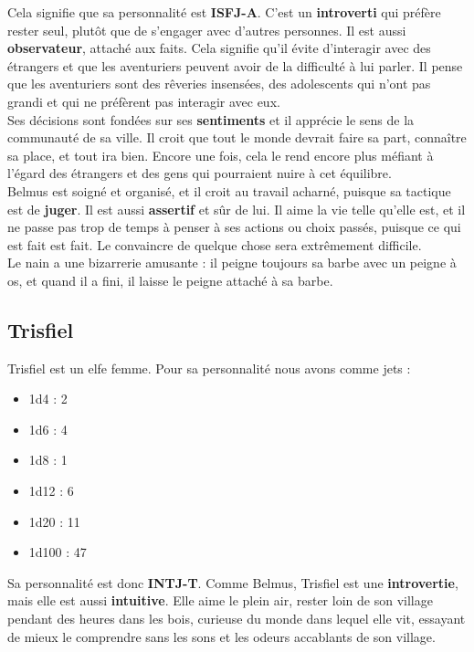 \documentclass{article}
\begin{document}
Cela signifie que sa personnalité est \textbf{ISFJ-A}. C'est un \textbf{introverti} qui préfère rester seul, plutôt que de s'engager avec d'autres personnes. Il est aussi \textbf{observateur}, attaché aux faits. Cela signifie qu'il évite d'interagir avec des étrangers et que les aventuriers peuvent avoir de la difficulté à lui parler. Il pense que les aventuriers sont des rêveries insensées, des adolescents qui n'ont pas grandi et qui ne préfèrent pas interagir avec eux.\\

Ses décisions sont fondées sur ses \textbf{sentiments} et il apprécie le sens de la communauté de sa ville. Il croit que tout le monde devrait faire sa part, connaître sa place, et tout ira bien. Encore une fois, cela le rend encore plus méfiant à l'égard des étrangers et des gens qui pourraient nuire à cet équilibre.\\

Belmus est soigné et organisé, et il croit au travail acharné, puisque sa tactique est de \textbf{juger}. Il est aussi \textbf{assertif} et sûr de lui. Il aime la vie telle qu'elle est, et il ne passe pas trop de temps à penser à ses actions ou choix passés, puisque ce qui est fait est fait. Le convaincre de quelque chose sera extrêmement difficile.\\

Le nain a une bizarrerie amusante : il peigne toujours sa barbe avec un peigne à os, et quand il a fini, il laisse le peigne attaché à sa barbe.

\subsection*{Trisfiel}
Trisfiel est un elfe femme. Pour sa personnalité nous avons comme jets :
\begin{itemize}
	\item 1d4 : 2
	\item 1d6 : 4
	\item 1d8 : 1
	\item 1d12 : 6
	\item 1d20 : 11
	\item 1d100 : 47
\end{itemize}
Sa personnalité est donc \textbf{INTJ-T}. Comme Belmus, Trisfiel est une \textbf{introvertie}, mais elle est aussi \textbf{intuitive}. Elle aime le plein air, rester loin de son village pendant des heures dans les bois, curieuse du monde dans lequel elle vit, essayant de mieux le comprendre sans les sons et les odeurs accablants de son village.\\
\end{document}
